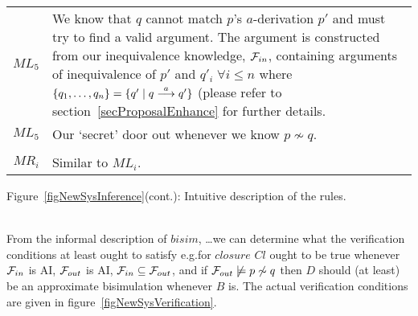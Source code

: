 \begin{minipage}{\linewidth}
\begin{tabular}{r@{$\;$:$\;\;$}p{.7\linewidth}}
$ML_5$ &
We know that $q$ cannot match $p$'s $a$-derivation $p'$ and must try to find a valid argument. The argument is constructed from our inequivalence knowledge, ${\cal F}_{in}$, containing arguments of inequivalence of $p'$ and $q'_i\;\forall i\leq n$ where $\{q_1,\ldots,q_n\} = \{q'\mid q\stackrel{a}{\longrightarrow}q'\}$ (please refer to section~\ref{secProposalEnhance} for further details.\\

$ML_5$ &
Our `secret' door out whenever we know $p\not\sim q$.\\
\multicolumn{2}{l}{}\\

$MR_i$ & Similar to $ML_i$.

\end{tabular}
\endgroup
\begin{center}
Figure~\ref{figNewSysInference}(cont.): Intuitive description of the rules.\\
\ \\
\end{center}
\end{minipage}

From the informal description of $bisim$, \ldots we can determine what the verification conditions at least ought to satisfy e.g.\@ for $closure$ $Cl$ ought to be true whenever ${\cal F}_{in}$ is AI, ${\cal F}_{out}$ is AI, ${\cal F}_{in}\subseteq{\cal F}_{out}$, and if ${\cal F}_{out}\not\models p\not\sim q$ then $D$ should (at least) be an approximate bisimulation whenever $B$ is. The actual verification conditions are given in figure~\ref{figNewSysVerification}.


